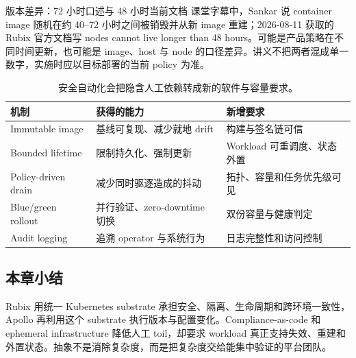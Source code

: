\begin{warningbox}{版本差异：72 小时口述与 48 小时当前文档}
课堂字幕中，Sankar 说 container image 随机在约 40--72 小时之间被销毁并从新 image 重建；2026-08-11 获取的 Rubix 官方文档写 nodes cannot live longer than 48 hours。可能是产品策略在不同时间更新，也可能是 image、host 与 node 的口径差异。讲义不把两者混成单一数字，实施时应以目标部署的当前 policy 为准。
\end{warningbox}

\begin{table}[H]
\centering
\begin{tabular}{L{0.19\textwidth}L{0.32\textwidth}L{0.39\textwidth}}
\toprule
机制 & 获得的能力 & 新增要求 \\
\midrule
Immutable image & 基线可复现、减少就地 drift & 构建与签名链可信 \\
Bounded lifetime & 限制持久化、强制更新 & Workload 可重调度、状态外置 \\
Policy-driven drain & 减少同时驱逐造成的抖动 & 拓扑、容量和任务优先级可见 \\
Blue/green rollout & 并行验证、zero-downtime 切换 & 双份容量与健康判定 \\
Audit logging & 追溯 operator 与系统行为 & 日志完整性和访问控制 \\
\bottomrule
\end{tabular}
\caption{安全自动化会把隐含人工依赖转成新的软件与容量要求。}
\end{table}

\subsection{本章小结}

Rubix 用统一 Kubernetes substrate 承担安全、隔离、生命周期和跨环境一致性，Apollo 再利用这个 substrate 执行版本与配置变化。Compliance-as-code 和 ephemeral infrastructure 降低人工 toil，却要求 workload 真正支持失效、重建和外置状态。抽象不是消除复杂度，而是把复杂度交给能集中验证的平台团队。

